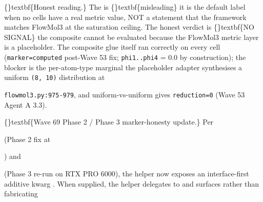 \documentclass{article}
\begin{document}
\begin{table}[ht]
\centering
\small
{}%
\end{table}

\{\}textbf\{Honest reading.\} The  is \{\}textbf\{misleading\}  it is the default label when no cells have a real metric value, NOT a statement that the framework matches FlowMol3 at the saturation ceiling. The honest verdict is \{\}textbf\{NO SIGNAL\}  the composite cannot be evaluated because the FlowMol3 metric layer is a placeholder. The composite glue itself ran correctly on every cell (\texttt{marker=computed} post-Wave 53 fix; \texttt{phi1..phi4} = 0.0 by construction); the blocker is the per-atom-type marginal  the placeholder adapter synthesises a uniform \texttt{(8, 10)} distribution at

\texttt{flowmol3.py:975-979}, and uniform-vs-uniform gives \texttt{reduction=0} (Wave 53 Agent A 3.3).

\{\}textbf\{Wave 69 Phase 2 / Phase 3 marker-honesty update.\} Per

 (Phase 2 fix at

) and

 (Phase 3 re-run on RTX PRO 6000), the helper  now exposes an interface-first additive kwarg . When supplied, the helper delegates to  and surfaces  rather than fabricating
\end{document}
